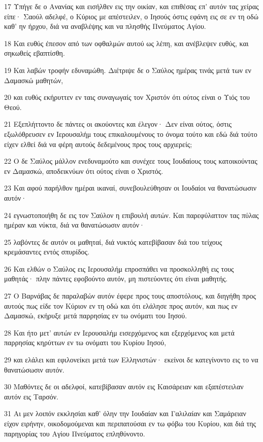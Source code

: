 \par 17 Υπήγε δε ο Ανανίας και εισήλθεν εις την οικίαν, και επιθέσας επ' αυτόν τας χείρας είπε· Σαούλ αδελφέ, ο Κύριος με απέστειλεν, ο Ιησούς όστις εφάνη εις σε εν τη οδώ καθ' ην ήρχου, διά να αναβλέψης και να πλησθής Πνεύματος Αγίου.
\par 18 Και ευθύς έπεσον από των οφθαλμών αυτού ως λέπη, και ανέβλεψεν ευθύς, και σηκωθείς εβαπτίσθη.
\par 19 Και λαβών τροφήν εδυναμώθη. Διέτριψε δε ο Σαύλος ημέρας τινάς μετά των εν Δαμασκώ μαθητών,
\par 20 και ευθύς εκήρυττεν εν ταις συναγωγαίς τον Χριστόν ότι ούτος είναι ο Υιός του Θεού.
\par 21 Εξεπλήττοντο δε πάντες οι ακούοντες και έλεγον· Δεν είναι ούτος, όστις εξωλόθρευσεν εν Ιερουσαλήμ τους επικαλουμένους το όνομα τούτο και εδώ διά τούτο είχεν ελθεί διά να φέρη αυτούς δεδεμένους προς τους αρχιερείς;
\par 22 Ο δε Σαύλος μάλλον ενεδυναμούτο και συνέχεε τους Ιουδαίους τους κατοικούντας εν Δαμασκώ, αποδεικνύων ότι ούτος είναι ο Χριστός.
\par 23 Και αφού παρήλθον ημέραι ικαναί, συνεβουλεύθησαν οι Ιουδαίοι να θανατώσωσιν αυτόν·
\par 24 εγνωστοποιήθη δε εις τον Σαύλον η επιβουλή αυτών. Και παρεφύλαττον τας πύλας ημέραν και νύκτα, διά να θανατώσωσιν αυτόν·
\par 25 λαβόντες δε αυτόν οι μαθηταί, διά νυκτός κατεβίβασαν διά του τείχους κρεμάσαντες εντός σπυρίδος.
\par 26 Και ελθών ο Σαύλος εις Ιερουσαλήμ επροσπάθει να προσκολληθή εις τους μαθητάς· πλην πάντες εφοβούντο αυτόν, μη πιστεύοντες ότι είναι μαθητής.
\par 27 Ο Βαρνάβας δε παραλαβών αυτόν έφερε προς τους αποστόλους, και διηγήθη προς αυτούς πως είδε τον Κύριον εν τη οδώ και ότι ελάλησε προς αυτόν, και πως εν Δαμασκώ, εκήρυξε μετά παρρησίας εν τω ονόματι του Ιησού.
\par 28 Και ήτο μετ' αυτών εν Ιερουσαλήμ εισερχόμενος και εξερχόμενος και μετά παρρησίας κηρύττων εν τω ονόματι του Κυρίου Ιησού,
\par 29 και ελάλει και εφιλονείκει μετά των Ελληνιστών· εκείνοι δε κατεγίνοντο εις το να θανατώσωσιν αυτόν.
\par 30 Μαθόντες δε οι αδελφοί, κατεβίβασαν αυτόν εις Καισάρειαν και εξαπέστειλαν αυτόν εις Ταρσόν.
\par 31 Αι μεν λοιπόν εκκλησίαι καθ' όλην την Ιουδαίαν και Γαλιλαίαν και Σαμάρειαν είχον ειρήνην, οικοδομούμεναι και περιπατούσαι εν τω φόβω του Κυρίου, και διά της παρηγορίας του Αγίου Πνεύματος επληθύνοντο.
